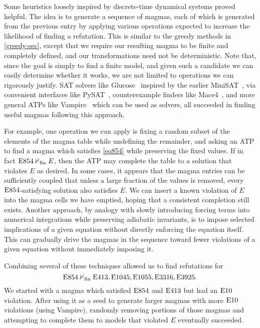  Some heuristics loosely inspired by discrete-time dynamical systems proved helpful.
 The idea is to generate a sequence of magmas, each of which is generated from the previous entry by applying various operations expected to increase the likelihood of
 finding a refutation.  This is similar to the greedy methods in \ref{greedy-sec}, except that we require our resulting magma to be finite and completely
 defined, and our transformations need not be deterministic.  Note that, since the goal is simply to find a finite model, and given such a candidate we can easily
 determine whether it works, we are not limited to operations we can rigorously justify.  SAT solvers like
 Glucose~\cite{DBLP:conf/ijcai/AudemardS09,DBLP:conf/cp/AudemardS12} inspired by the earlier MiniSAT~\cite{DBLP:conf/sat/EenS03},
 via convenient interfaces like PySAT~\cite{imms-sat18, itk-sat24}, counterexample finders like Mace4~\cite{prover9-mace4}, and more general ATPs like
 Vampire~\cite{DBLP:conf/cav/KovacsV13} which can be used as solvers, all succeeded in finding useful magmas following this approach.

 For example, one operation we can apply is fixing a random subset of the elements of the magma table while undefining the remainder,
 and asking an ATP to find a magma which satisfies \eqref{eq854} while preserving the fixed values.
 If in fact $\mathrm{E}854 \nvdash_{\mathrm{fin}} E$, then the ATP may complete the table to a solution that violates $E$ as desired.  In some cases,
 it appears that the magma entries can be sufficiently coupled that unless a large fraction of the values is removed,
 every $\mathrm{E}854$-satisfying solution also satisfies $E$.
 We can insert a known violation of $E$ into the magma cells we have emptied, hoping that a consistent completion still exists.
 Another approach, by analogy with slowly introducing forcing terms into numerical integrations while preserving adiabatic invariants, is to impose selected
 implications of a given equation without directly enforcing the equation itself.  This can gradually drive the magmas in the
 sequence toward fewer violations of a given equation without immediately imposing it.

Combining several of these techniques allowed us to find refutations for
$$\mathrm{E}854 \nvdash_{\mathrm{fin}} \mathrm{E}413, \mathrm{E}1045, \mathrm{E}1055, \mathrm{E}3316, \mathrm{E}3925.$$
 We started with a magma which satisfied $\mathrm{E}854$ and $\mathrm{E}413$ but had an $\mathrm{E}10$ violation.
After using it as a seed to generate larger magmas with more $\mathrm{E}10$ violations (using Vampire),
randomly removing portions of those magmas and attempting to complete them to models that violated $E$ eventually succeeded.

